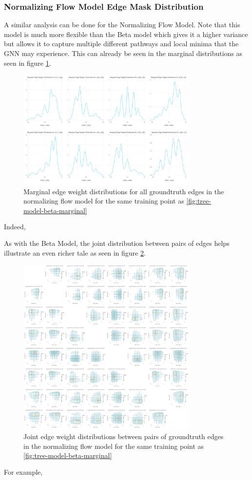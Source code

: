 \subsubsection{Normalizing Flow Model Edge Mask Distribution}
A similar analysis can be done for the Normalizing Flow Model. Note that this model is much more flexible than the Beta model which gives it a higher variance but allows it to capture multiple different pathways and local minima that the GNN may experience. This can already be seen in the marginal distributions as seen in figure \ref{fig:tree-model-dnfg-marginal}.
\begin{figure}[htb]
	\centering
	\includegraphics[width=0.8\textwidth]{images/tree-model-dnfg-marginal.pdf}
	\caption{Marginal edge weight distributions for all groundtruth edges in the normalizing flow model for the same training point as \ref{fig:tree-model-beta-marginal}}
	\label{fig:tree-model-dnfg-marginal}
\end{figure}

Indeed, 

As with the Beta Model, the joint distribution between pairs of edges helps illustrate an even richer tale as seen in figure \ref{fig:tree-model-dnfg-joint}.
\begin{figure}[htb]
	\centering
	\includegraphics[width=0.8\textwidth]{images/tree-model-dnfg-joint.pdf}
	\caption{Joint edge weight distributions between pairs of groundtruth edges in the normalizing flow model for the same training point as \ref{fig:tree-model-beta-marginal}}
	\label{fig:tree-model-dnfg-joint}
\end{figure}

For example,

\newpage
